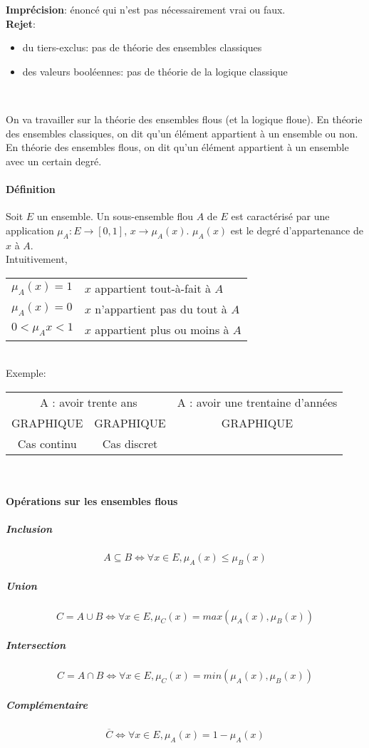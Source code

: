 \documentclass[a4paper,12pt]{article}
\begin{document}
	\textbf{Imprécision}: énoncé qui n'est pas nécessairement vrai ou faux.\\
	
	\textbf{Rejet}:
	\begin{itemize}
		\item du tiers-exclus: pas de théorie des ensembles classiques
		\item des valeurs booléennes: pas de théorie de la logique classique
	\end{itemize}
	~
	
	On va travailler sur la théorie des ensembles flous (et la logique floue). En théorie des ensembles classiques, on dit qu'un élément appartient à un ensemble ou non. En théorie des ensembles flous, on dit qu'un élément appartient à un ensemble avec un certain degré.\\
	
	\paragraph{Définition} Soit $E$ un ensemble. Un sous-ensemble flou $A$ de $E$ est caractérisé par une application $\mu_A : E \rightarrow [0,1]$, $x \rightarrow \mu_A(x)$. $\mu_A(x)$ est le degré d'appartenance de $x$ à $A$.\\
	
	Intuitivement, 
	\begin{tabular}{|ll|}
	\hline
	$\mu_A(x)=1$ & $x$ appartient tout-à-fait à $A$ \\
	$\mu_A(x)=0$ & $x$ n'appartient pas du tout à $A$ \\
	$0< \mu_A{x} < 1$ & $x$ appartient plus ou moins à $A$ \\
	\hline
	\end{tabular}
	~\\
	
	Exemple:
	
	\begin{tabular}{ccc}
	\multicolumn{2}{c}{A : avoir trente ans} & A : avoir une trentaine d'années \\
	GRAPHIQUE & GRAPHIQUE & GRAPHIQUE \\
	Cas continu & Cas discret & 
	\end{tabular}
	~\\
	
	\paragraph{Opérations sur les ensembles flous}
	\subparagraph{Inclusion}
		$$ A \subseteq B \Leftrightarrow {\forall x \in E, \mu_A(x) \le \mu_B(x)} $$
	\subparagraph{Union}
		$$ C = A \cup B \Leftrightarrow {\forall x \in E, \mu_C(x)=max(\mu_A(x),\mu_B(x))} $$
	\subparagraph{Intersection}
		$$ C = A \cap B \Leftrightarrow {\forall x \in E, \mu_C(x)=min(\mu_A(x),\mu_B(x))} $$
	\subparagraph{Complémentaire}
		$$ \overline{C} \Leftrightarrow {\forall x \in E, \mu_A(x)=1-\mu_A(x)}$$
		
\end{document}
